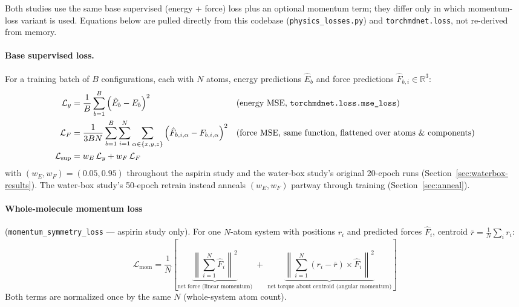 \documentclass[11pt]{article}
\begin{document}
Both studies use the same base supervised (energy + force) loss plus an
optional momentum term; they differ only in which momentum-loss variant is
used. Equations below are pulled directly from this codebase
(\texttt{physics\_losses.py}) and \texttt{torchmdnet.loss}, not re-derived
from memory.

\paragraph{Base supervised loss.} For a training batch of $B$ configurations,
each with $N$ atoms, energy predictions $\hat E_b$ and force predictions
$\hat F_{b,i} \in \mathbb{R}^3$:
\begin{align}
\mathcal{L}_y &= \frac{1}{B}\sum_{b=1}^{B} \left(\hat E_b - E_b\right)^2
&&\text{(energy MSE, \texttt{torchmdnet.loss.mse\_loss})} \\
\mathcal{L}_F &= \frac{1}{3BN}\sum_{b=1}^{B}\sum_{i=1}^{N}\sum_{\alpha \in \{x,y,z\}}
\left(\hat F_{b,i,\alpha} - F_{b,i,\alpha}\right)^2
&&\text{(force MSE, same function, flattened over atoms \& components)} \\
\mathcal{L}_{\mathrm{sup}} &= w_E\, \mathcal{L}_y + w_F\, \mathcal{L}_F
\end{align}
with $(w_E, w_F) = (0.05, 0.95)$ throughout the aspirin study and the
water-box study's original 20-epoch runs (Section~\ref{sec:waterbox-results}).
The water-box study's 50-epoch retrain instead anneals $(w_E, w_F)$ partway
through training (Section~\ref{sec:anneal}).

\paragraph{Whole-molecule momentum loss} (\texttt{momentum\_symmetry\_loss} ---
aspirin study only). For one $N$-atom system with positions $r_i$ and
predicted forces $\hat F_i$, centroid $\bar r = \frac{1}{N}\sum_i r_i$:
\begin{equation}
\mathcal{L}_{\mathrm{mom}} = \frac{1}{N}\left[
\underbrace{\left\lVert \textstyle\sum_{i=1}^N \hat F_i \right\rVert^2}_{\text{net force (linear momentum)}}
\;+\;
\underbrace{\left\lVert \textstyle\sum_{i=1}^N (r_i - \bar r) \times \hat F_i \right\rVert^2}_{\text{net torque about centroid (angular momentum)}}
\right]
\label{eq:mom-whole}
\end{equation}
Both terms are normalized once by the same $N$ (whole-system atom count).
\end{document}
